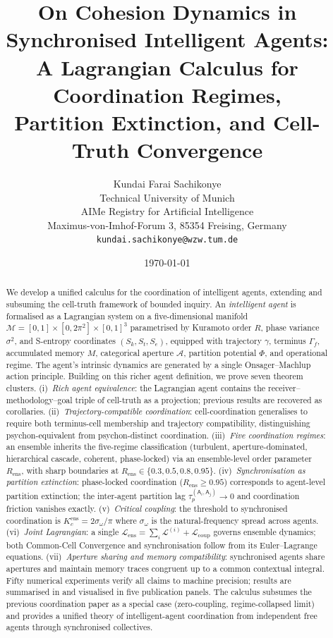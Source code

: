 \documentclass[11pt,twocolumn,a4paper]{article}
\title{\textbf{On Cohesion Dynamics in Synchronised Intelligent Agents:\\
A Lagrangian Calculus for Coordination Regimes,\\
Partition Extinction, and Cell-Truth Convergence}}
\author{Kundai Farai Sachikonye\\
Technical University of Munich\\
AIMe Registry for Artificial Intelligence\\
Maximus-von-Imhof-Forum 3, 85354 Freising, Germany\\
\texttt{kundai.sachikonye@wzw.tum.de}}
\date{\today}
\newcommand{\Aper}{\mathcal{A}}
\newcommand{\agent}{\mathsf{A}}
\newcommand{\Sk}{S_k}
\newcommand{\St}{S_t}
\newcommand{\Se}{S_e}
\newcommand{\Lag}{\mathcal{L}}
\newcommand{\Pot}{\Phi}
\newcommand{\Kc}{K_c}
\newcommand{\tauP}{\tau_p}
\newcommand{\Ord}{R}
\begin{document}
\maketitle

\begin{abstract}
We develop a unified calculus for the coordination of intelligent agents,
extending and subsuming the cell-truth framework of bounded inquiry. An
\emph{intelligent agent} is formalised as a Lagrangian system on a
five-dimensional manifold $\mathcal{M}=[0,1]\times[0,2\pi^2]\times[0,1]^3$
parametrised by Kuramoto order $R$, phase variance $\sigma^2$, and
S-entropy coordinates $(\Sk,\St,\Se)$, equipped with trajectory $\gamma$,
terminus $\Gamma_f$, accumulated memory $M$, categorical aperture
$\Aper$, partition potential $\Pot$, and operational regime. The agent's
intrinsic dynamics are generated by a single Onsager--Machlup action
principle. Building on this richer agent definition, we prove seven
theorem clusters. (i)~\emph{Rich agent equivalence}: the Lagrangian
agent contains the receiver--methodology--goal triple of cell-truth as a
projection; previous results are recovered as corollaries.
(ii)~\emph{Trajectory-compatible coordination}: cell-coordination
generalises to require both terminus-cell membership and trajectory
compatibility, distinguishing psychon-equivalent from psychon-distinct
coordination.
(iii)~\emph{Five coordination regimes}: an ensemble inherits the
five-regime classification (turbulent, aperture-dominated, hierarchical
cascade, coherent, phase-locked) via an ensemble-level order parameter
$\Ord_{\mathrm{ens}}$, with sharp boundaries at
$\Ord_{\mathrm{ens}}\in\{0.3,0.5,0.8,0.95\}$.
(iv)~\emph{Synchronisation as partition extinction}: phase-locked
coordination ($\Ord_{\mathrm{ens}}\ge 0.95$) corresponds to
agent-level partition extinction; the inter-agent partition lag
$\tauP^{(\agent_i,\agent_j)}\to 0$ and coordination friction vanishes
exactly. (v)~\emph{Critical coupling}: the threshold to synchronised
coordination is $\Kc^{\mathrm{ens}}=2\sigma_\omega/\pi$ where
$\sigma_\omega$ is the natural-frequency spread across agents.
(vi)~\emph{Joint Lagrangian}: a single
$\Lag_{\mathrm{ens}}=\sum_i\Lag^{(i)}+\Lag_{\mathrm{coup}}$ governs
ensemble dynamics; both Common-Cell Convergence and synchronisation
follow from its Euler--Lagrange equations.
(vii)~\emph{Aperture sharing and memory compatibility}: synchronised
agents share apertures and maintain memory traces congruent up to a
common contextual integral. Fifty numerical experiments verify all
claims to machine precision; results are summarised in
 and visualised in five publication panels. The
calculus subsumes the previous coordination paper as a special case
(zero-coupling, regime-collapsed limit) and provides a unified theory
of intelligent-agent coordination from independent free agents through
synchronised collectives.
\end{abstract}
\end{document}
